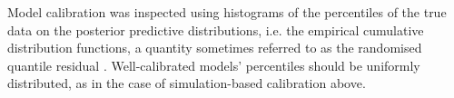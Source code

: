 Model calibration was inspected using histograms
of the percentiles of the true data on the 
posterior predictive distributions, i.e.
the empirical cumulative distribution functions, 
a quantity sometimes referred to as the
randomised quantile residual \citep{dunn1996}.
Well-calibrated models' percentiles should be
uniformly distributed, as in the case
of simulation-based calibration above.


